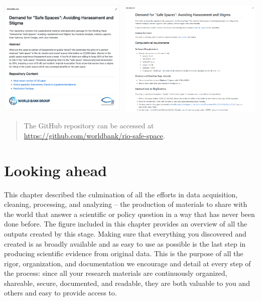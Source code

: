 \documentclass[
]{book}
\begin{document}
\begin{ex}
\includegraphics[width=0.46\textwidth,height=\textheight]{examples/home.png}
\includegraphics[width=0.53\textwidth,height=\textheight]{examples/github.png}

\begin{quote}
The GitHub repository can be accessed at \url{https://github.com/worldbank/rio-safe-space}.
\end{quote}
\end{ex}

\hypertarget{looking-ahead-7}{%
\section*{Looking ahead}\label{looking-ahead-7}}

This chapter described the culmination of all the efforts in data acquisition, cleaning, processing, and analyzing --
the production of materials to share with the world
that answer a scientific or policy question in a way that has
never been done before.
The figure included in this chapter provides an overview
of all the outputs created by this stage.
Making sure that everything you discovered and created
is as broadly available and as easy to use as possible
is the last step in producing scientific evidence from original data.
This is the purpose of all the rigor, organization, and documentation
we encourage and detail at every step of the process:
since all your research materials are
continuously organized, shareable, secure, documented, and readable,
they are both valuable to you and others and easy to provide access to.
\end{document}
